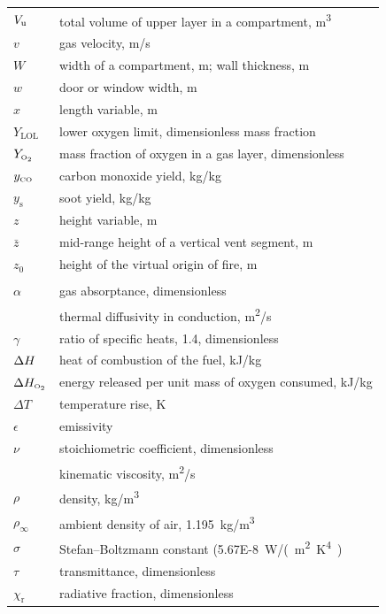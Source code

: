 \documentclass[12pt,twoside]{book}
\begin{document}
\begin{center}
\begin{longtable}{p{1in}  p{5.5 in}}
$V\sb{\mathrm{u}}$               & total volume of upper layer in a compartment, \unit{m^3} \\
$v$                 & gas velocity, \unit{m/s} \\
$W$                 & width of a compartment, m; wall thickness, m \\
$w$                 & door or window width, m \\
$x$                 & length variable, m \\
$Y_{\mathrm{LOL}}$       & lower oxygen limit, dimensionless mass fraction \\
$Y_{\scriptscriptstyle\mathrm{O\sb{2}}}$           & mass fraction of oxygen in a gas layer, dimensionless \\
$y_{{\scriptscriptstyle\mathrm{CO}}}$           & carbon monoxide yield, \unit{kg/kg} \\
$y_{\mathrm{s}}$         & soot yield, \unit{kg/kg} \\
$z$                 & height variable, m \\
$\bar{z}$           & mid-range height of a vertical vent segment, m \\
$z_0$               & height of the virtual origin of fire, m \\
  \\
$\alpha$            & gas absorptance, dimensionless \\
                    & thermal diffusivity in conduction, \unit{m^2/s} \\
$\gamma$            & ratio of specific heats, 1.4, dimensionless \\
$\Delta H$               & heat of combustion of the fuel, \unit{kJ/kg} \\
$\Delta H\sb{{\scriptscriptstyle\mathrm{O\sb{2}}}}$              & energy released per unit mass of oxygen consumed, \unit{kJ/kg} \\
$\Delta T$          & temperature rise, K \\
$\epsilon$          & emissivity \\
$\nu$               & stoichiometric coefficient, dimensionless \\
                    & kinematic viscosity, \unit{m^2/s} \\
$\rho$              & density, \unit{kg/m^3} \\
$\rho_\infty$       & ambient density of air, 1.195~\unit{kg/m^3} \\
$\sigma$            & Stefan--Boltzmann constant (\num{5.67E-8}~\unit{W/(m^2.K^4)} \\
$\tau$              & transmittance, dimensionless \\
$\chi_{\mathrm{r}}$      & radiative fraction, dimensionless \\
\end{longtable}

\end{center}
\end{document}
